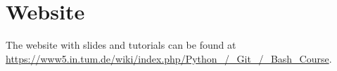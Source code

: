 \documentclass[11pt]{article}
\begin{document}

\section*{Website}
The website with slides and tutorials can be found at\\
\url{https://www5.in.tum.de/wiki/index.php/Python_/_Git_/_Bash_Course}.
\end{document}
